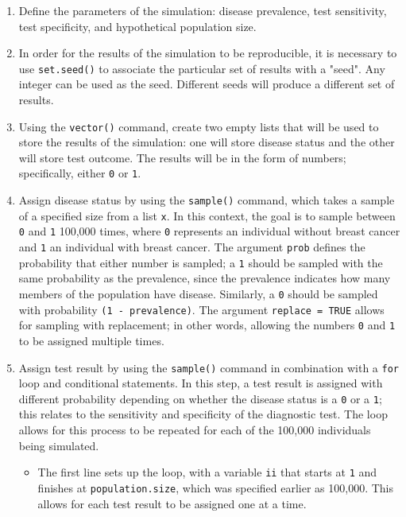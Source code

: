 \documentclass{report}\usepackage[]{graphicx}\usepackage[]{color}
\begin{document}
\begin{enumerate}
  \item Define the parameters of the simulation: disease prevalence, test sensitivity, test specificity, and hypothetical population size.
  
  \item In order for the results of the simulation to be reproducible, it is necessary to use \texttt{set.seed()} to associate the particular set of results with a "seed". Any integer can be used as the seed. Different seeds will produce a different set of results. 
  
  \item Using the \texttt{vector()} command, create two empty lists that will be used to store the results of the simulation: one will store disease status and the other will store test outcome. The results will be in the form of numbers; specifically, either \texttt{0} or \texttt{1}. 
  
  \item Assign disease status by using the \texttt{sample()} command, which takes a sample of a specified size from a list \texttt{x}. In this context, the goal is to sample between \texttt{0} and \texttt{1} 100,000 times, where \texttt{0} represents an individual without breast cancer and \texttt{1} an individual with breast cancer. The argument \texttt{prob} defines the probability that either number is sampled; a \texttt{1} should be sampled with the same probability as the prevalence, since the prevalence indicates how many members of the population have disease. Similarly, a \texttt{0} should be sampled with probability \texttt{(1 - prevalence)}. The argument \texttt{replace = TRUE} allows for sampling with replacement; in other words, allowing the numbers \texttt{0} and \texttt{1} to be assigned multiple times. 
  
  \item Assign test result by using the \texttt{sample()} command in combination with a \texttt{for} loop and conditional statements. In this step, a test result is assigned with different probability depending on whether the disease status is a \texttt{0} or a \texttt{1}; this relates to the sensitivity and specificity of the diagnostic test. The loop allows for this process to be repeated for each of the 100,000 individuals being simulated.
  
  \begin{itemize}
    \item The first line sets up the loop, with a variable \texttt{ii} that starts at \texttt{1} and finishes at \texttt{population.size}, which was specified earlier as 100,000. This allows for each test result to be assigned one at a time.
    

\end{itemize}
\end{enumerate}
\end{document}
